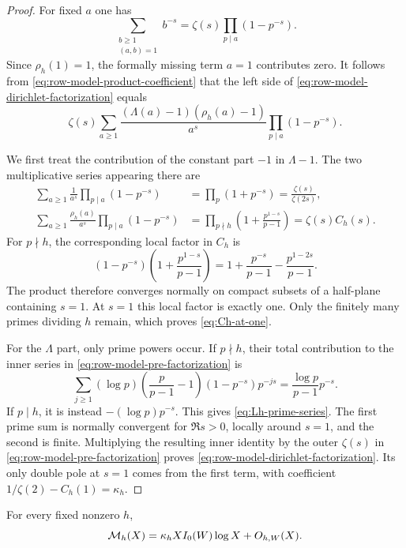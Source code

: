 \begin{proof}
For fixed $a$ one has
\[
 \sum_{\substack{b\geq1\\(a,b)=1}}b^{-s}
 =\zeta(s)\prod_{p\mid a}(1-p^{-s}).
\]
Since $\rho_h(1)=1$, the formally missing term $a=1$ contributes zero.
It follows from \eqref{eq:row-model-product-coefficient} that the left
side of \eqref{eq:row-model-dirichlet-factorization} equals
\begin{equation}
 \zeta(s)
 \sum_{a\geq1}
 \frac{(\Lambda(a)-1)(\rho_h(a)-1)}{a^s}
 \prod_{p\mid a}(1-p^{-s}).
 \label{eq:row-model-pre-factorization}
\end{equation}

We first treat the contribution of the constant part $-1$ in
$\Lambda-1$.  The two multiplicative series appearing there are
\begin{align*}
 \sum_{a\geq1}\frac1{a^s}\prod_{p\mid a}(1-p^{-s})
 &=\prod_p(1+p^{-s})=\frac{\zeta(s)}{\zeta(2s)},\\
 \sum_{a\geq1}\frac{\rho_h(a)}{a^s}
 \prod_{p\mid a}(1-p^{-s})
 &=\prod_{p\nmid h}
 \left(1+\frac{p^{1-s}}{p-1}\right)
 =\zeta(s)C_h(s).
\end{align*}
For $p\nmid h$, the corresponding local factor in $C_h$ is
\[
 (1-p^{-s})\left(1+\frac{p^{1-s}}{p-1}\right)
 =1+\frac{p^{-s}}{p-1}-\frac{p^{1-2s}}{p-1}.
\]
The product therefore converges normally on compact subsets of a
half-plane containing $s=1$.  At $s=1$ this local factor is exactly one.
Only the finitely many primes dividing $h$ remain, which proves
\eqref{eq:Ch-at-one}.

For the $\Lambda$ part, only prime powers occur.  If $p\nmid h$, their
total contribution to the inner series in
\eqref{eq:row-model-pre-factorization} is
\[
 \sum_{j\geq1}
 (\log p)\left(\frac{p}{p-1}-1\right)
 (1-p^{-s})p^{-js}
 =\frac{\log p}{p-1}p^{-s}.
\]
If $p\mid h$, it is instead $-(\log p)p^{-s}$.  This gives
\eqref{eq:Lh-prime-series}.  The first prime sum is normally convergent
for $\Re s>0$, locally around $s=1$, and the second is finite.  Multiplying
the resulting inner identity by the outer $\zeta(s)$ in
\eqref{eq:row-model-pre-factorization} proves
\eqref{eq:row-model-dirichlet-factorization}.  Its only double pole at
$s=1$ comes from the first term, with coefficient
$1/\zeta(2)-C_h(1)=\kappa_h$.
\end{proof}

\begin{theorem}
\label{thm:global-row-model-law}
For every fixed nonzero $h$,
\begin{equation}
 \mathcal M_h(X)
 =\kappa_hXI_0(W)\log X+O_{h,W}(X).
 \label{eq:global-row-model-law}
\end{equation}
\end{theorem}

